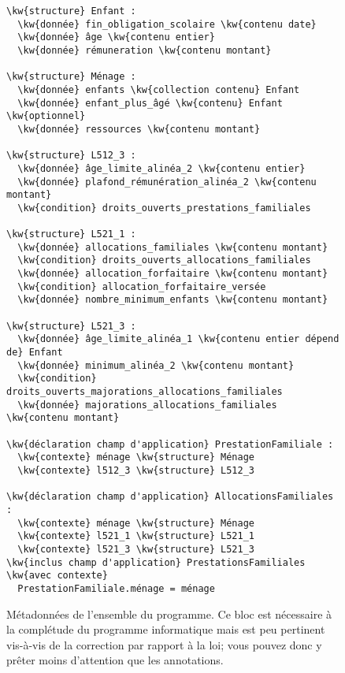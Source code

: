 \documentclass[12pt, french]{article}
\newcommand{\kw}[1]{\textbf{\textcolor{OliveGreen}{#1}}}
\newenvironment{metadata}{
  \begin{tcolorbox}[colframe=OliveGreen, title=\textcolor{black}{\texttt{Métadonnées}}, before skip=1em, after skip=1em]
}{
\end{tcolorbox}
}
\begin{document}
\begin{figure}[htpb]
\begin{metadata}
\begin{Verbatim}[commandchars=\\\{\}]
\kw{structure} Enfant :
  \kw{donnée} fin_obligation_scolaire \kw{contenu date}
  \kw{donnée} âge \kw{contenu entier}
  \kw{donnée} rémuneration \kw{contenu montant}

\kw{structure} Ménage :
  \kw{donnée} enfants \kw{collection contenu} Enfant
  \kw{donnée} enfant_plus_âgé \kw{contenu} Enfant \kw{optionnel}
  \kw{donnée} ressources \kw{contenu montant}

\kw{structure} L512_3 :
  \kw{donnée} âge_limite_alinéa_2 \kw{contenu entier}
  \kw{donnée} plafond_rémunération_alinéa_2 \kw{contenu montant}
  \kw{condition} droits_ouverts_prestations_familiales

\kw{structure} L521_1 :
  \kw{donnée} allocations_familiales \kw{contenu montant}
  \kw{condition} droits_ouverts_allocations_familiales
  \kw{donnée} allocation_forfaitaire \kw{contenu montant}
  \kw{condition} allocation_forfaitaire_versée
  \kw{donnée} nombre_minimum_enfants \kw{contenu montant}

\kw{structure} L521_3 :
  \kw{donnée} âge_limite_alinéa_1 \kw{contenu entier dépend de} Enfant
  \kw{donnée} minimum_alinéa_2 \kw{contenu montant}
  \kw{condition} droits_ouverts_majorations_allocations_familiales
  \kw{donnée} majorations_allocations_familiales \kw{contenu montant}

\kw{déclaration champ d'application} PrestationFamiliale :
  \kw{contexte} ménage \kw{structure} Ménage
  \kw{contexte} l512_3 \kw{structure} L512_3

\kw{déclaration champ d'application} AllocationsFamiliales :
  \kw{contexte} ménage \kw{structure} Ménage
  \kw{contexte} l521_1 \kw{structure} L521_1
  \kw{contexte} l521_3 \kw{structure} L521_3
\kw{inclus champ d'application} PrestationsFamiliales \kw{avec contexte}
  PrestationFamiliale.ménage = ménage
\end{Verbatim}
\end{metadata}
\caption{Métadonnées de l'ensemble du programme. Ce bloc est nécessaire à la complétude du programme informatique
mais est peu pertinent vis-à-vis de la correction par rapport à la loi; vous pouvez donc y prêter moins d'attention que les annotations.}
\end{figure}

\end{document}
